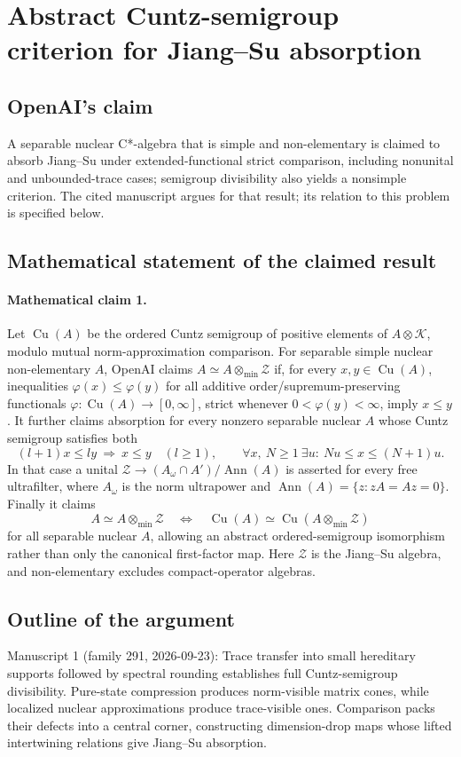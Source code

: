\documentclass[11pt]{article}
\begin{document}
\section*{Abstract Cuntz-semigroup criterion for Jiang–Su absorption}

\subsection{OpenAI's claim}
A separable nuclear C*-algebra that is simple and non-elementary is claimed to absorb Jiang--Su under extended-functional strict comparison, including nonunital and unbounded-trace cases; semigroup divisibility also yields a nonsimple criterion. The cited manuscript argues for that result; its relation to this problem is specified below.

\subsection{Mathematical statement of the claimed result}
\paragraph{Mathematical claim 1.} Let $\operatorname{Cu}(A)$ be the ordered Cuntz semigroup of positive elements of $A\otimes\mathcal K$, modulo mutual norm-approximation comparison. For separable simple nuclear non-elementary $A$, OpenAI claims $A\simeq A\otimes_{\min}\mathcal Z$ if, for every $x,y\in\operatorname{Cu}(A)$, inequalities $\varphi(x)\le\varphi(y)$ for all additive order/supremum-preserving functionals $\varphi:\operatorname{Cu}(A)\to[0,\infty]$, strict whenever $0<\varphi(y)<\infty$, imply $x\le y$.
It further claims absorption for every nonzero separable nuclear $A$ whose Cuntz semigroup satisfies both
\[
(l+1)x\le ly\ \Longrightarrow\ x\le y\quad(l\ge1),\qquad
\forall x,\ N\ge1\ \exists u:\ Nu\le x\le(N+1)u.
\]
In that case a unital $\mathcal Z\to (A_\omega\cap A')/\operatorname{Ann}(A)$ is asserted for every free ultrafilter, where $A_\omega$ is the norm ultrapower and $\operatorname{Ann}(A)=\{z:zA=Az=0\}$. Finally it claims
\[
A\simeq A\otimes_{\min}\mathcal Z\quad\Longleftrightarrow\quad
\operatorname{Cu}(A)\simeq\operatorname{Cu}(A\otimes_{\min}\mathcal Z)
\]
for all separable nuclear $A$, allowing an abstract ordered-semigroup isomorphism rather than only the canonical first-factor map. Here $\mathcal Z$ is the Jiang--Su algebra, and non-elementary excludes compact-operator algebras.

\subsection{Outline of the argument}
Manuscript 1 (family 291, 2026-09-23): Trace transfer into small hereditary supports followed by spectral rounding establishes full Cuntz-semigroup divisibility. Pure-state compression produces norm-visible matrix cones, while localized nuclear approximations produce trace-visible ones. Comparison packs their defects into a central corner, constructing dimension-drop maps whose lifted intertwining relations give Jiang--Su absorption.
\end{document}
